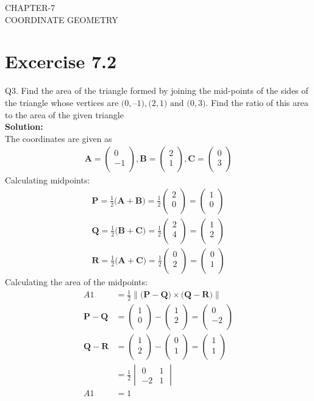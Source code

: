 \documentclass[12pt]{article}
\newcommand{\mydet}[1]{\ensuremath{\begin{vmatrix}#1\end{vmatrix}}}
\providecommand{\norm}[1]{\left\lVert#1\right\rVert}
\newcommand{\solution}{\noindent \textbf{Solution: }}
\newcommand{\myvec}[1]{\ensuremath{\begin{pmatrix}#1\end{pmatrix}}}
\let\vec\mathbf
\begin{document}
\begin{center}
\textbf\large{CHAPTER-7 \\ COORDINATE GEOMETRY}
\end{center}
\section*{Excercise 7.2}

Q3. Find the area of the triangle formed by joining the mid-points of the sides of the triangle
whose vertices are $\vec(0, –1), \vec(2, 1) \text{ and } \vec(0, 3)$. Find the ratio of this area to the area of the
given triangle
\\
\solution
\\
The coordinates are given as
	\begin{align}
	\vec{A} = \myvec{
		0\\
		-1\\
		},
	\vec{B} = \myvec{
		2\\
		1\\
		},
	\vec{C} = \myvec{
		0\\
		3\\
		}
	\end{align}
Calculating midpoints:
	\begin{align}
		\vec{P} = \frac{1}{2}\vec(\vec{A}+\vec{B}) = \frac{1}{2}\myvec{2\\0\\} = \myvec{1\\0\\}\\
		\vec{Q} = \frac{1}{2}\vec(\vec{B}+\vec{C}) = \frac{1}{2}\myvec{2\\4\\} = \myvec{1\\2\\}\\
		\vec{R} = \frac{1}{2}\vec(\vec{A}+\vec{C}) = \frac{1}{2}\myvec{0\\2\\} = \myvec{0\\1\\}
	\end{align}
Calculating the area of the midpoints:
	\begin{align}
		A1&=\frac{1}{2}{\norm{\vec(\vec{P}-\vec{Q})\times\vec(\vec{Q}-\vec{R})}}\\
		\vec{P}-\vec{Q} &=  \myvec{
  1 \\
  0 \\
 } - \myvec{
  1 \\
  2 \\
 } = \myvec{
 0 \\
 -2 \\
 }
		\\
		\vec{Q}-\vec{R} &=  \myvec{
  1 \\
  2 \\
 } - \myvec{
  0 \\
  1 \\
 } = \myvec{
 1 \\
 1 \\
 }
 \\
		&=\frac{1}{2}\mydet{0 & 1\\-2 & 1}\\
	      A1&=1
	\end{align}
\end{document}
